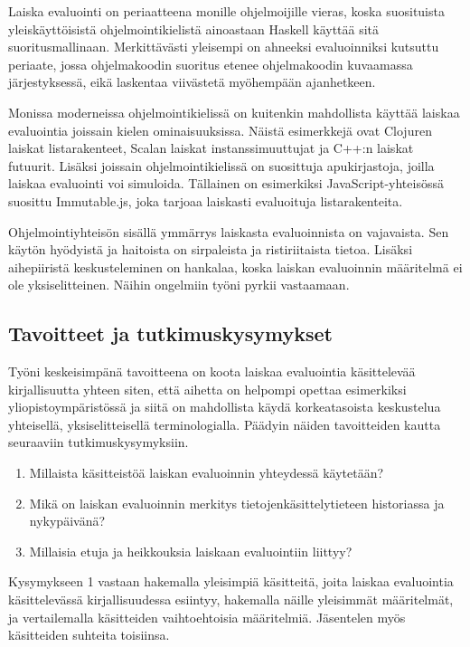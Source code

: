 Laiska evaluointi on periaatteena monille ohjelmoijille vieras, koska suosituista yleiskäyttöisistä ohjelmointikielistä ainoastaan Haskell käyttää sitä suoritusmallinaan. Merkittävästi yleisempi on ahneeksi evaluoinniksi kutsuttu periaate, jossa ohjelmakoodin suoritus etenee ohjelmakoodin kuvaamassa järjestyksessä, eikä laskentaa viivästetä myöhempään ajanhetkeen.

Monissa moderneissa ohjelmointikielissä on kuitenkin mahdollista käyttää laiskaa evaluointia joissain kielen ominaisuuksissa. Näistä esimerkkejä ovat Clojuren laiskat listarakenteet, Scalan laiskat instanssimuuttujat ja C++:n laiskat futuurit. Lisäksi joissain ohjelmointikielissä on suosittuja apukirjastoja, joilla laiskaa evaluointi voi simuloida. Tällainen on esimerkiksi JavaScript-yhteisössä suosittu Immutable.js, joka tarjoaa laiskasti evaluoituja listarakenteita.

Ohjelmointiyhteisön sisällä ymmärrys laiskasta evaluoinnista on vajavaista. Sen käytön hyödyistä ja haitoista on sirpaleista ja ristiriitaista tietoa. Lisäksi aihepiiristä keskusteleminen on hankalaa, koska laiskan evaluoinnin määritelmä ei ole yksiselitteinen. Näihin ongelmiin työni pyrkii vastaamaan.

\subsection{Tavoitteet ja tutkimuskysymykset}

Työni keskeisimpänä tavoitteena on koota laiskaa evaluointia käsittelevää kirjallisuutta yhteen siten, että aihetta on helpompi opettaa esimerkiksi yliopistoympäristössä ja siitä on mahdollista käydä korkeatasoista keskustelua yhteisellä, yksiselitteisellä terminologialla. Päädyin näiden tavoitteiden kautta seuraaviin tutkimuskysymyksiin.

\begin{enumerate}
  \item{Millaista käsitteistöä laiskan evaluoinnin yhteydessä käytetään?}
  \item{Mikä on laiskan evaluoinnin merkitys tietojenkäsittelytieteen historiassa ja nykypäivänä?}
  \item{Millaisia etuja ja heikkouksia laiskaan evaluointiin liittyy?}
\end{enumerate}

Kysymykseen 1 vastaan hakemalla yleisimpiä käsitteitä, joita laiskaa evaluointia käsittelevässä kirjallisuudessa esiintyy, hakemalla näille yleisimmät määritelmät, ja vertailemalla käsitteiden vaihtoehtoisia määritelmiä. Jäsentelen myös käsitteiden suhteita toisiinsa.

